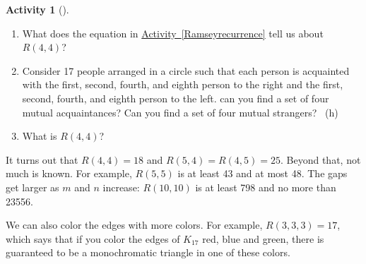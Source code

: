 \documentclass[10pt,]{book}
\theoremstyle{plain}
\theoremstyle{definition}
\theoremstyle{definition}
\theoremstyle{definition}
\newtheorem{activity}[project]{Activity}
\numberwithin{equation}{chapter}
\begin{document}
\begin{activity}[]\label{Ramseybound2}
\leavevmode%
\begin{enumerate}[font=\bfseries,label=(\alph*),ref=\alph*]
\item\label{task-58} \hypertarget{p-422}{}%
What does the equation in \hyperref[Ramseyrecurrence]{Activity~\ref{Ramseyrecurrence}} tell us about \(R(4,4)\)?%
\item\label{task-59} \hypertarget{p-424}{}%
Consider 17 people arranged in a circle such that each person is acquainted with the first, second, fourth, and eighth person to the right and the first, second, fourth, and eighth person to the left.  can you find a set of four mutual acquaintances?  Can you find a set of four mutual strangers?%
~{\tiny (h)}\item\label{task-60} \hypertarget{p-427}{}%
What is \(R(4,4)\)?%
\end{enumerate}
\end{activity}
\hypertarget{p-428}{}%
It turns out that \(R(4,4) = 18\) and \(R(5, 4) = R(4,5) = 25\).  Beyond that, not much is known.  For example, \(R(5,5)\) is at least 43 and at most 48.  The gaps get larger as \(m\) and \(n\) increase: \(R(10,10)\) is at least 798 and no more than 23556.%
\par
\hypertarget{p-429}{}%
We can also color the edges with more colors.  For example, \(R(3,3,3) = 17\), which says that if you color the edges of \(K_{17}\) red, blue and green, there is guaranteed to be a monochromatic triangle in one of these colors.%
\typeout{************************************************}
\typeout{************************************************}
\end{document}
